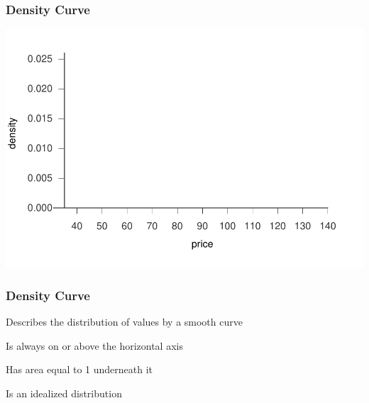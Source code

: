 \documentclass[12pt]{beamer}\usepackage[]{graphicx}\usepackage[]{color}
\makeatletter
\newenvironment{kframe}{%
 \def\at@end@of@kframe{}%
 \ifinner\ifhmode%
  \def\at@end@of@kframe{\end{minipage}}%
  \begin{minipage}{\columnwidth}%
 \fi\fi%
 \def\FrameCommand##1{\hskip\@totalleftmargin \hskip-\fboxsep
 \colorbox{shadecolor}{##1}\hskip-\fboxsep
     \hskip-\linewidth \hskip-\@totalleftmargin \hskip\columnwidth}%
 \MakeFramed {\advance\hsize-\width
   \@totalleftmargin\z@ \linewidth\hsize
   \@setminipage}}%
 {\par\unskip\endMakeFramed%
 \at@end@of@kframe}
\newenvironment{knitrout}{}{} %
\makeatother
\begin{document}
\begin{frame}[fragile]
\frametitle{Density Curve}
\begin{knitrout}\footnotesize
{}\color{fgcolor}\begin{kframe}


{\ttfamily\noindent\bfseries\color{errorcolor}{\#\# Error in density(tickets): object 'tickets' not found}}\end{kframe}

{\centering \includegraphics[width=.8\linewidth,height=.6\linewidth]{figure/unnamed-chunk-26-1} 

}


\begin{kframe}

{\ttfamily\noindent\bfseries\color{errorcolor}{\#\# Error in xy.coords(x, y): object 'dens' not found}}\end{kframe}
\end{knitrout}

\end{frame}


\begin{frame}
\frametitle{Density Curve}

\bi
  \item Describes the distribution of values by a smooth curve
  \item Is always on or above the horizontal axis
  \item Has area equal to 1 underneath it
  \item Is an idealized distribution
\ei
\eb

\end{frame}
\end{document}
